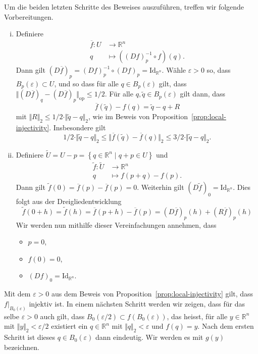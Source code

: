 \documentclass[../main.tex]{subfiles}
\begin{document}
Um die beiden letzten Schritte des Beweises auszuführen,
treffen wir folgende Vorbereitungen.
\begin{enumerate}[(i)]
  \item Definiere
    \begin{align*}
      \overline f \colon U & \to \mathbb{R}^n \\
      q & \mapsto ({(Df)}_p^{-1} \circ f)(q).
    \end{align*}
    Dann gilt ${(D \overline f)}_p = {(Df)}_p^{-1} \circ {(Df)}_p 
    = \text{Id}_{\mathbb{R}^n}$.
    Wähle $\varepsilon > 0$ so, dass $B_p(\varepsilon) \subset U$,
    und so dass für alle $q \in B_p(\varepsilon)$ gilt, dass
    \(
      \Vert {(D \overline f)}_q - {(D \overline f)}_p \Vert_{\text{op}}
        \leq 1/2
    \).
    Für alle $q, \widetilde q \in B_p(\varepsilon)$ gilt dann, dass
    \[
      \overline f ( \widetilde q ) - f(q) = \widetilde q - q + R
    \]
    mit $\Vert R \Vert_2 \leq 1/2 \cdot \Vert \widetilde q - q \Vert_2$,
    wie im Beweis von Proposition~\ref{prop:local-injectivity}.
    Insbesondere gilt
    \[
      1/2 \cdot \Vert \widetilde q - q \Vert_2 \leq
      \Vert \overline f ( \widetilde q ) - \overline f (q) \Vert_2
      \leq 3/2 \cdot \Vert \widetilde q - q \Vert_2.
    \]
  \item Definiere $\widetilde U = U - p
    = \left\{q \in \mathbb{R}^n \mid q + p \in U\right\}$
    und 
    \begin{align*}
      \widetilde f \colon \widetilde U & \to \mathbb{R}^n \\
      q & \mapsto f(p + q) - f(p).
    \end{align*}
    Dann gilt $\widetilde f ( 0 ) = \overline f(p) - \overline f (p) = 0$.
    Weiterhin gilt ${(D\widetilde f )}_0 = \text{Id}_{\mathbb{R}^n}$.
    Dies folgt aus der Dreigliedentwicklung
    \[
      \widetilde f ( 0 + h ) = \widetilde f (h)
      = \overline f ( p + h ) - \overline f ( p )
      = {(D \overline f )}_p(h) + {(R \overline f)}_p (h)
    \]
    Wir werden nun mithilfe dieser Vereinfachungen annehmen,
    dass
    \begin{itemize}
      \item $p = 0$,
      \item $f(0) = 0$,
      \item ${(Df)}_0 = \text{Id}_{\mathbb{R}^n}$.
    \end{itemize}
\end{enumerate}

Mit dem $\varepsilon > 0$ aus dem Beweis von
Proposition~\ref{prop:local-injectivity} gilt,
dass
$f |_{B_0(\varepsilon)}$ injektiv ist.
In einem nächsten Schritt werden wir zeigen,
dass für das selbe $\varepsilon > 0$ auch gilt,
dass $B_0(\varepsilon/2) \subset f(B_0(\varepsilon))$,
das heisst, für alle $y \in \mathbb{R}^n$ 
mit $\Vert y \Vert_2 < \varepsilon/2$ existiert
ein $q \in \mathbb{R}^n$ mit $\Vert q \Vert_2 < \varepsilon$ 
und $f(q) = y$.
Nach dem ersten Schritt ist dieses $q \in B_0(\varepsilon)$ 
dann eindeutig. Wir werden es mit $g(y)$ bezeichnen.
\end{document}
